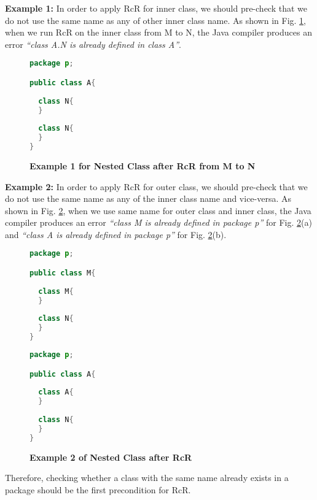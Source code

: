\textbf{Example 1:} In order to apply RcR for inner class, we should pre-check that we do not use the same name as any of other inner class name. As shown in Fig. \ref{figure:nestedclass1}, when we run RcR on the inner class from M to N, the Java compiler produces an error \textit{``class A.N is already defined in class A''}. 

\begin{figure}[th]
\centering
\begin{minipage}[t]{0.5\linewidth}
\begin{lstlisting}[language=java, basicstyle=\scriptsize\ttfamily,frame=single]
package p;

public class A{	
    
  class N{
  }
    
  class N{
  }
} 
\end{lstlisting}
\end{minipage}
\caption{\textbf{Example 1 for Nested Class after RcR from M to N}}
\label{figure:nestedclass1}
\end{figure}

\textbf{Example 2:} In order to apply RcR for outer class, we should pre-check that we do not use the same name as any of the inner class name and vice-versa. 
As shown in Fig. \ref{figure:nestedclass2}, when we use same name for outer class and inner class, the Java compiler produces an error \textit{``class M is already defined in package p''} for Fig. \ref{figure:nestedclass2}(a) and \textit{``class A is already defined in package p''} for Fig. \ref{figure:nestedclass2}(b).

\begin{figure}[th]
\centering
\begin{minipage}[t]{0.45\linewidth}
\begin{lstlisting}[language=java, basicstyle=\scriptsize\ttfamily,frame=single]
package p;

public class M{	
  
  class M{
  }
	
  class N{
  }
} 
\end{lstlisting}
\end{minipage}
\hfill
\begin{minipage}[t]{0.45\linewidth}
\begin{lstlisting}[language=java, basicstyle=\scriptsize\ttfamily,frame=single]
package p;

public class A{	
    
  class A{
  }
    
  class N{
  }
} 
\end{lstlisting}
\end{minipage}
\caption{\textbf{Example 2 of Nested Class after RcR}}
\label{figure:nestedclass2}
\end{figure}

Therefore, checking whether a class with the same name already exists in a package should be the first precondition for RcR. 
   
